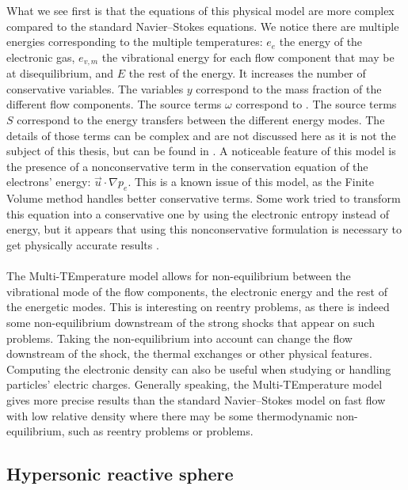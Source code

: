       What we see first is that the equations of this physical model are more complex compared to the standard Navier--Stokes equations.
      We notice there are multiple energies corresponding to the multiple temperatures: $e_e$ the energy of the electronic gas, $e_{v, m}$ the vibrational energy for each flow component that may be at disequilibrium, and $E$ the rest of the energy.
      It increases the number of conservative variables.
      The variables $y$ correspond to the mass fraction of the different flow components.
      The source terms $\omega$ correspond to .
      The source terms $S$ correspond to the energy transfers between the different energy modes.
      The details of those terms can be complex and are not discussed here as it is not the subject of this thesis, but can be found in \cite{Soubrie2006}.
      A noticeable feature of this model is the presence of a nonconservative term in the conservation equation of the electrons' energy: $\vec{u} \cdot \nabla p_e$.
      This is a known issue of this model, as the Finite Volume method handles better conservative terms.
      Some work tried to transform this equation into a conservative one by using the electronic entropy instead of energy\cite{CoquelMarmignon1995}, but it appears that using this nonconservative formulation is necessary to get physically accurate results .

      \paragraph{}
      The Multi-TEmperature model allows for non-equilibrium between the vibrational mode of the flow components, the electronic energy and the rest of the energetic modes.
      This is interesting on reentry problems, as there is indeed some non-equilibrium downstream of the strong shocks that appear on such problems.
      Taking the non-equilibrium into account can change the flow downstream of the shock, the thermal exchanges or other physical features.
      Computing the electronic density can also be useful when studying  or handling particles' electric charges.
      Generally speaking, the Multi-TEmperature model gives more precise results than the standard Navier--Stokes model on fast flow with low relative density where there may be some thermodynamic non-equilibrium, such as reentry problems or  problems.


    \subsection{Hypersonic reactive sphere}

